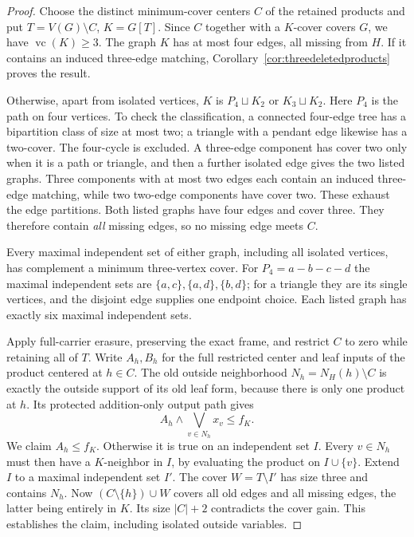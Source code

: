 \documentclass[11pt]{article}
\newcommand{\vc}{\operatorname{vc}}
\theoremstyle{definition}
\theoremstyle{remark}
\begin{document}
\begin{proof}
Choose the distinct minimum-cover centers $C$ of the retained products and put $T=V(G)\setminus C$, $K=G[T]$. Since $C$ together with a $K$-cover covers $G$, we have $\vc(K)\ge3$. The graph $K$ has at most four edges, all missing from $H$. If it contains an induced three-edge matching, Corollary~\ref{cor:threedeletedproducts} proves the result.

Otherwise, apart from isolated vertices, $K$ is $P_4\sqcup K_2$ or $K_3\sqcup K_2$. Here $P_4$ is the path on four vertices. To check the classification, a connected four-edge tree has a bipartition class of size at most two; a triangle with a pendant edge likewise has a two-cover. The four-cycle is excluded. A three-edge component has cover two only when it is a path or triangle, and then a further isolated edge gives the two listed graphs. Three components with at most two edges each contain an induced three-edge matching, while two two-edge components have cover two. These exhaust the edge partitions. Both listed graphs have four edges and cover three. They therefore contain \emph{all} missing edges, so no missing edge meets $C$.

Every maximal independent set of either graph, including all isolated vertices, has complement a minimum three-vertex cover. For $P_4=a-b-c-d$ the maximal independent sets are $\{a,c\},\{a,d\},\{b,d\}$; for a triangle they are its single vertices, and the disjoint edge supplies one endpoint choice. Each listed graph has exactly six maximal independent sets.

Apply full-carrier erasure, preserving the exact frame, and restrict $C$ to zero while retaining all of $T$. Write $A_h,B_h$ for the full restricted center and leaf inputs of the product centered at $h\in C$. The old outside neighborhood $N_h=N_H(h)\setminus C$ is exactly the outside support of its old leaf form, because there is only one product at $h$. Its protected addition-only output path gives
\[
 A_h\wedge\bigvee_{v\in N_h}x_v\le f_K.
\]
We claim $A_h\le f_K$. Otherwise it is true on an independent set $I$. Every $v\in N_h$ must then have a $K$-neighbor in $I$, by evaluating the product on $I\cup\{v\}$. Extend $I$ to a maximal independent set $I'$. The cover $W=T\setminus I'$ has size three and contains $N_h$. Now $(C\setminus\{h\})\cup W$ covers all old edges and all missing edges, the latter being entirely in $K$. Its size $|C|+2$ contradicts the cover gain. This establishes the claim, including isolated outside variables.


\end{proof}
\end{document}
